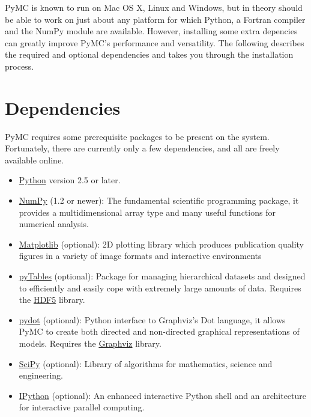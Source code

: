 


PyMC is known to run on Mac OS X, Linux and Windows, but in theory should be 
able to work on just about any platform for which Python, a Fortran compiler
and the NumPy module are  available. However, installing some extra 
depencies can greatly improve PyMC's performance and versatility. 
The following describes the required and optional dependencies and takes you 
through the installation process.



\hypertarget{dependencies}{}
\section*{Dependencies}

PyMC requires some prerequisite packages to be present on the system. 
Fortunately, there are currently only a few dependencies, and all are 
freely available online.
\begin{itemize}
\item {} 
\href{http://www.python.org/.}{Python} version 2.5 or later.

\item {} 
\href{http://www.scipy.org/NumPy}{NumPy} (1.2 or newer): The fundamental scientific programming package, it provides a 
multidimensional array type and many useful functions for numerical analysis.

\item {} 
\href{http://matplotlib.sourceforge.net/}{Matplotlib} (optional): 2D plotting library which produces publication 
quality figures in a variety of image formats and interactive environments

\item {} 
\href{http://www.pytables.org/moin}{pyTables} (optional): Package for managing hierarchical datasets and 
designed to efficiently and easily cope with extremely large amounts of data.
Requires the \href{http://www.hdfgroup.org/HDF5/}{HDF5} library.

\item {} 
\href{http://code.google.com/p/pydot/}{pydot} (optional): Python interface to Graphviz's Dot language, it allows
PyMC to create both directed and non-directed graphical representations of models.
Requires the \href{http://www.graphviz.org/}{Graphviz} library.

\item {} 
\href{http://www.scipy.org/}{SciPy} (optional): Library of algorithms for mathematics, science 
and engineering.

\item {} 
\href{http://ipython.scipy.org/}{IPython} (optional): An enhanced interactive Python shell and an 
architecture for interactive parallel computing.

\end{itemize}

